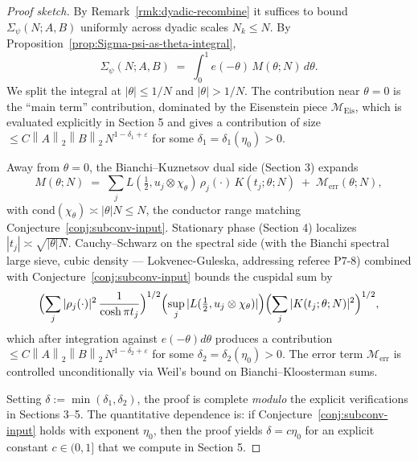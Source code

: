 \documentclass[11pt]{article}
\theoremstyle{definition}
\newcommand{\cond}{\mathrm{cond}}
\newcommand{\norm}[1]{\left\lVert #1\right\rVert}
\begin{document}
\begin{proof}[Proof sketch]
By Remark~\ref{rmk:dyadic-recombine} it suffices to bound $\Sigma_\psi(N;A,B)$ uniformly across dyadic scales $N_k\le N$. By Proposition~\ref{prop:Sigma-psi-as-theta-integral},
\[
\Sigma_\psi(N;A,B)\;=\;\int_0^1 e(-\theta)\,M(\theta;N)\,d\theta.
\]
We split the integral at $|\theta|\le 1/N$ and $|\theta|>1/N$. The contribution near $\theta=0$ is the ``main term'' contribution, dominated by the Eisenstein piece $\mathcal M_{\mathrm{Eis}}$, which is evaluated explicitly in Section 5 and gives a contribution of size $\le C\norm{A}_2\norm{B}_2\,N^{1-\delta_1+\varepsilon}$ for some $\delta_1=\delta_1(\eta_0)>0$.

Away from $\theta=0$, the Bianchi--Kuznetsov dual side (Section 3) expands
\[
M(\theta;N)\;=\;\sum_j L(\tfrac12,u_j\otimes\chi_\theta)\,\rho_j(\cdot)\,K(t_j;\theta;N)\;+\;\mathcal M_{\mathrm{err}}(\theta;N),
\]
with $\cond(\chi_\theta)\asymp |\theta|N\le N$, the conductor range matching Conjecture~\ref{conj:subconv-input}. Stationary phase (Section 4) localizes $|t_j|\asymp \sqrt{|\theta|N}$. Cauchy--Schwarz on the spectral side (with the Bianchi spectral large sieve, cubic density --- Lokvenec-Guleska, addressing referee P7-8) combined with Conjecture~\ref{conj:subconv-input} bounds the cuspidal sum by
\[
\Bigl(\sum_j |\rho_j(\cdot)|^2\,\frac{1}{\cosh\pi t_j}\Bigr)^{1/2}\Bigl(\sup_j|L(\tfrac12,u_j\otimes\chi_\theta)|\Bigr)\Bigl(\sum_j|K(t_j;\theta;N)|^2\Bigr)^{1/2},
\]
which after integration against $e(-\theta)d\theta$ produces a contribution $\le C\norm{A}_2\norm{B}_2\,N^{1-\delta_2+\varepsilon}$ for some $\delta_2=\delta_2(\eta_0)>0$. The error term $\mathcal M_{\mathrm{err}}$ is controlled unconditionally via Weil's bound on Bianchi--Kloosterman sums.

Setting $\delta:=\min(\delta_1,\delta_2)$, the proof is complete \emph{modulo} the explicit verifications in Sections 3--5. The quantitative dependence is: if Conjecture~\ref{conj:subconv-input} holds with exponent $\eta_0$, then the proof yields $\delta=c\eta_0$ for an explicit constant $c\in(0,1]$ that we compute in Section 5.
\end{proof}
\end{document}

